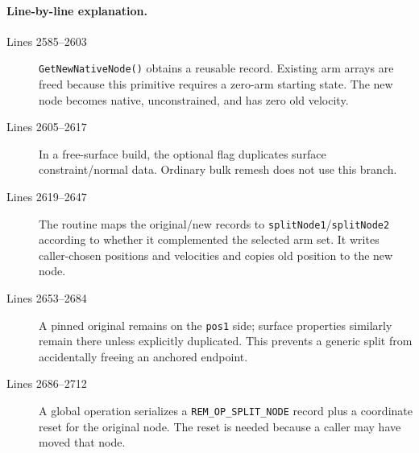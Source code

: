 \documentclass[11pt]{article}
\newcommand{\code}[1]{\texorpdfstring{\nolinkurl{#1}}{#1}}
\begin{document}
\paragraph{Line-by-line explanation.}
\begin{description}
\item[Lines 2585--2603] \code{GetNewNativeNode()} obtains a reusable record.
Existing arm arrays are freed because this primitive requires a zero-arm
starting state. The new node becomes native, unconstrained, and has zero old
velocity.
\item[Lines 2605--2617] In a free-surface build, the optional flag duplicates
surface constraint/normal data. Ordinary bulk remesh does not use this branch.
\item[Lines 2619--2647] The routine maps the original/new records to
\code{splitNode1}/\code{splitNode2} according to whether it complemented the
selected arm set. It writes caller-chosen positions and velocities and copies
old position to the new node.
\item[Lines 2653--2684] A pinned original remains on the \code{pos1} side;
surface properties similarly remain there unless explicitly duplicated. This
prevents a generic split from accidentally freeing an anchored endpoint.
\item[Lines 2686--2712] A global operation serializes a
\code{REM_OP_SPLIT_NODE} record plus a coordinate reset for the original
node. The reset is needed because a caller may have moved that node.
\end{description}


\end{document}
